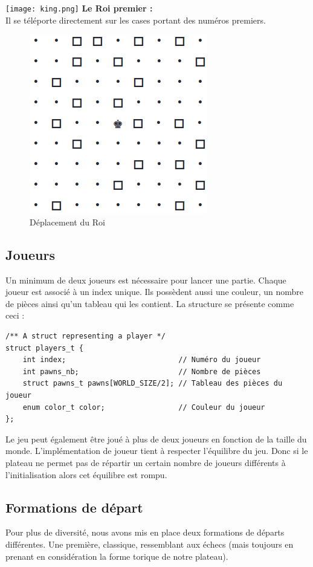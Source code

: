         \texttt{[image: king.png]} \textbf{Le Roi premier :} \\
        Il se téléporte directement sur les cases portant des numéros premiers.
        \medbreak
                     \begin{figure}[H]
                \centering
                \includegraphics[scale=0.3]{img/dep_king.png}
                \caption{Déplacement du Roi}
                \label{fig:dep_king}
            \end{figure}
    
    \subsection{Joueurs}
        Un minimum de deux joueurs est nécessaire pour lancer une partie. Chaque joueur est associé à un index unique. Ils possèdent aussi une couleur, un nombre de pièces ainsi qu'un tableau qui les contient. La structure se présente comme ceci :
        \begin{lstlisting}
/** A struct representing a player */
struct players_t {
    int index;                          // Numéro du joueur 
    int pawns_nb;                       // Nombre de pièces
    struct pawns_t pawns[WORLD_SIZE/2]; // Tableau des pièces du joueur 
    enum color_t color;                 // Couleur du joueur
};\end{lstlisting}

        Le jeu peut également être joué à plus de deux joueurs en fonction de la taille du monde. L'implémentation de joueur tient à respecter l'équilibre du jeu. Donc si le plateau ne permet pas de répartir un certain nombre de joueurs différents à l'initialisation alors cet équilibre est rompu. 
    \subsection{Formations de départ}
            Pour plus de diversité, nous avons mis en place deux formations de départs différentes. Une première, classique, ressemblant aux échecs (mais toujours en prenant en considération la forme torique de notre plateau).
            \medbreak
            
